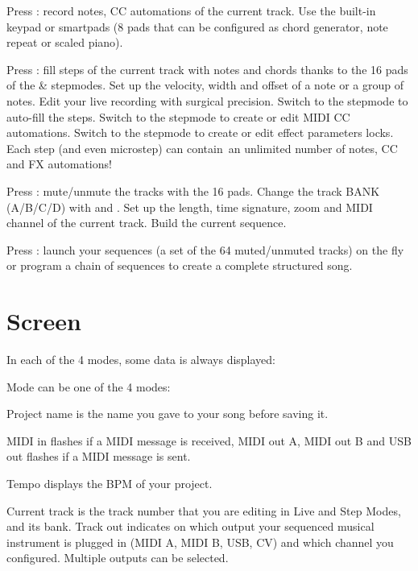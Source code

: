 Press : record notes, CC automations of the current track. Use the built-in keypad or smartpads (8 pads that can be configured as chord generator, note repeat or scaled piano).


Press : fill steps of the current track with notes and chords thanks to the 16 pads of the  \&  stepmodes. Set up the velocity, width and offset of a note or a group of notes. Edit your live recording with surgical precision. Switch to the  stepmode to auto-fill the steps. Switch to the  stepmode to create or edit MIDI CC automations. Switch to the  stepmode to create or edit effect parameters locks. Each step (and even microstep) can contain an unlimited number of notes, CC and FX automations!


Press : mute/unmute the tracks with the 16 pads. Change the track BANK (A/B/C/D) with \btn{<} and \btn{>}. Set up the length, time signature, zoom and MIDI channel of the current track. Build the current sequence.


Press : launch your sequences (a set of the 64 muted/unmuted tracks) on the fly or program a chain of sequences to create a complete structured song.



\section{Screen}

In each of the 4 modes, some data is always displayed:


\textcolor{pygreen}{Mode} can be one of the 4 modes:    

\textcolor{pygreen}{Project name} is the name you gave to your song before saving it.

\textcolor{pygreen}{MIDI in} flashes if a MIDI message is received, \textcolor{pygreen}{MIDI out A}, \textcolor{pygreen}{MIDI out B} and \textcolor{pygreen}{USB out} flashes if a MIDI message is sent.

\textcolor{pygreen}{Tempo} displays the BPM of your project.

\textcolor{pyred}{Current track} is the track number that you are editing in Live and Step Modes, and its bank. \textcolor{pyred}{Track out} indicates on which output your sequenced musical instrument is plugged in (MIDI A, MIDI B, USB, CV) and which channel you configured. Multiple outputs can be selected.

